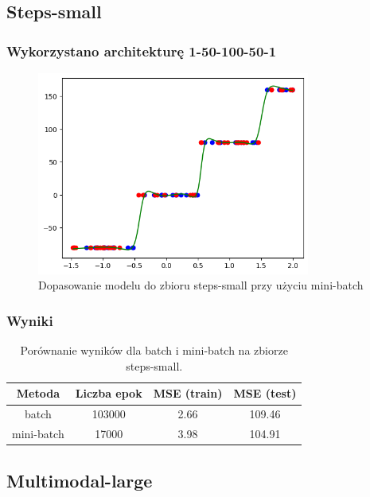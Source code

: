 \documentclass{article}
\begin{document}
\subsection*{Steps-small}
\subsubsection*{Wykorzystano architekturę 1-50-100-50-1}
\begin{figure}[H]
    \centering
    \includegraphics[width=0.8\textwidth]{img/nn2/steps-small_mini-batch_training_fit.png}
    \caption{Dopasowanie modelu do zbioru steps-small przy użyciu mini-batch}
\end{figure}

\subsubsection*{Wyniki}
\begin{table}[H]
    \centering
    \begin{tabular}{|c|c|c|c|}
        \hline
        Metoda & Liczba epok & MSE (train) & MSE (test) \\
        \hline
        batch & 103000 & 2.66 & 109.46 \\
        mini-batch & 17000 & 3.98 & 104.91 \\
        \hline
    \end{tabular}
    \caption{Porównanie wyników dla batch i mini-batch na zbiorze steps-small.}
\end{table}

\subsection*{Multimodal-large}
\end{document}
